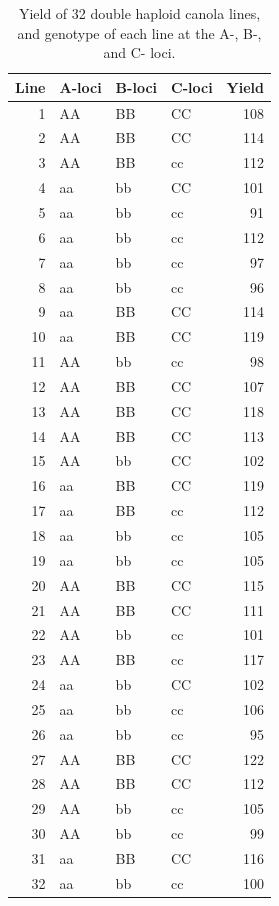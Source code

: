 \documentclass[
  ignorenonframetext,
  aspectratio=169]{beamer}
\begin{document}
\begin{frame}{}
\protect\hypertarget{section-8}{}
\renewcommand{\arraystretch}{0.8}

\begin{table}

\caption{\label{tab:marker-phenotype-data}Yield of 32 double haploid canola lines, and genotype of each line at the A-, B-, and C- loci.}
\centering
\fontsize{5}{7}\selectfont
\begin{tabular}[t]{rlllr}
\toprule
Line & A-loci & B-loci & C-loci & Yield\\
\midrule
1 & AA & BB & CC & 108\\
2 & AA & BB & CC & 114\\
3 & AA & BB & cc & 112\\
4 & aa & bb & CC & 101\\
5 & aa & bb & cc & 91\\
6 & aa & bb & cc & 112\\
7 & aa & bb & cc & 97\\
8 & aa & bb & cc & 96\\
9 & aa & BB & CC & 114\\
10 & aa & BB & CC & 119\\
11 & AA & bb & cc & 98\\
12 & AA & BB & CC & 107\\
13 & AA & BB & CC & 118\\
14 & AA & BB & CC & 113\\
15 & AA & bb & CC & 102\\
16 & aa & BB & CC & 119\\
17 & aa & BB & cc & 112\\
18 & aa & bb & cc & 105\\
19 & aa & bb & cc & 105\\
20 & AA & BB & CC & 115\\
21 & AA & BB & CC & 111\\
22 & AA & bb & cc & 101\\
23 & AA & BB & cc & 117\\
24 & aa & bb & CC & 102\\
25 & aa & bb & cc & 106\\
26 & aa & bb & cc & 95\\
27 & AA & BB & CC & 122\\
28 & AA & BB & CC & 112\\
29 & AA & bb & cc & 105\\
30 & AA & bb & cc & 99\\
31 & aa & BB & CC & 116\\
32 & aa & bb & cc & 100\\
\bottomrule
\end{tabular}
\end{table}
\end{frame}
\end{document}

